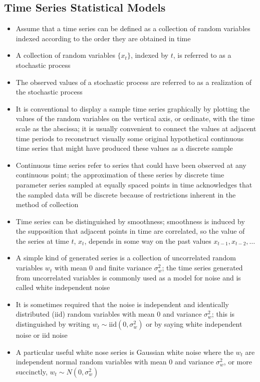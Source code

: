 \documentclass[12pt]{article}
\begin{document}
\subsection{Time Series Statistical Models}
\begin{itemize}
\item Assume that a time series can be defined as a collection of random variables indexed according to the order they are obtained in time 
\item A collection of random variables $\{x_t\}$, indexed by $t$, is referred to as a stochastic process 
\item The observed values of a stochastic process are referred to as a realization of the stochastic process 
\item It is conventional to display a sample time series graphically by plotting the values of the random variables on the vertical axis, or ordinate, with the time scale as the abscissa; it is usually convenient to connect the values at adjacent time periods to reconstruct visually some original hypothetical continuous time series that might have produced these values as a discrete sample 
\item Continuous time series refer to series that could have been observed at any continuous point; the approximation of these series by discrete time parameter series sampled at equally spaced points in time acknowledges that the sampled data will be discrete because of restrictions inherent in the method of collection 
\item Time series can be distinguished by smoothness; smoothness is induced by the supposition that adjacent points in time are correlated, so the value of the series at time $t$, $x_t$, depends in some way on the past values $x_{t-1},x_{t-2},\dots$ 
\item A simple kind of generated series is a collection of uncorrelated random variables $w_t$ with mean $0$ and finite variance $\sigma^2_w$; the time series generated from uncorrelated variables is commonly used as a model for noise and is called white independent noise
\item It is sometimes required that the noise is independent and identically distributed (iid) random variables with mean $0$ and variance $\sigma^2_w$; this is distinguished by writing $w_t \sim \text{iid}(0, \sigma^2_w)$ or by saying white independent noise or iid noise
\item A particular useful white nose series is Gaussian white noise where the $w_t$ are independent normal random variables with mean $0$ and variance $\sigma^2_w$, or more succinctly, $w_t \sim N(0, \sigma^2_w)$

\end{itemize}
\end{document}

